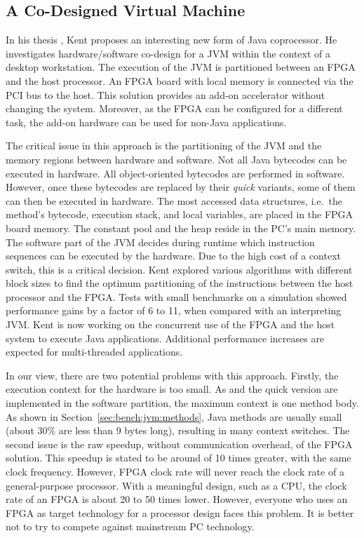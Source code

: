 \subsection{A Co-Designed Virtual Machine}

In his thesis \cite{KentPhD}, Kent proposes an interesting new form
of Java coprocessor. He investigates hardware/software co-design for
a JVM within the context of a desktop workstation. The execution of
the JVM is partitioned between an FPGA and the host processor. An
FPGA board with local memory is connected via the PCI bus to the
host. This solution provides an add-on accelerator without changing
the system. Moreover, as the FPGA can be configured for a different
task, the add-on hardware can be used for non-Java applications.

The critical issue in this approach is the partitioning of the JVM
and the memory regions between hardware and software. Not all Java
bytecodes can be executed in hardware. All object-oriented bytecodes
are performed in software. However, once these bytecodes are replaced
by their \textit{quick} variants, some of them can then be executed
in hardware. The most accessed data structures, i.e.\ the method's
bytecode, execution stack, and local variables, are placed in the
FPGA board memory. The constant pool and the heap reside in the PC's
main memory. The software part of the JVM decides during runtime
which instruction sequences can be executed by the hardware. Due to
the high cost of a context switch, this is a critical decision. Kent
explored various algorithms with different block sizes to find the
optimum partitioning of the instructions between the host processor
and the FPGA. Tests with small benchmarks on a simulation showed
performance gains by a factor of 6 to 11, when compared with an
interpreting JVM. Kent is now working on the concurrent use of the
FPGA and the host system to execute Java applications. Additional
performance increases are expected for multi-threaded applications.

In our view, there are two potential problems with this approach.
Firstly, the execution context for the hardware is too small. As
 and the quick version are implemented in the
software partition, the maximum context is one method body. As shown
in Section~\ref{sec:bench:jvm:methods}, Java methods are usually
small (about 30\% are less than 9 bytes long), resulting in many
context switches. The second issue is the raw speedup, without
communication overhead, of the FPGA solution. This speedup is stated
to be around of 10 times greater, with the same clock frequency.
However, FPGA clock rate will never reach the clock rate of a
general-purpose processor. With a meaningful design, such as a CPU,
the clock rate of an FPGA is about 20 to 50 times lower. However,
everyone who uses an FPGA as target technology for a processor
design faces this problem. It is better not to try to compete
against mainstream PC technology.

